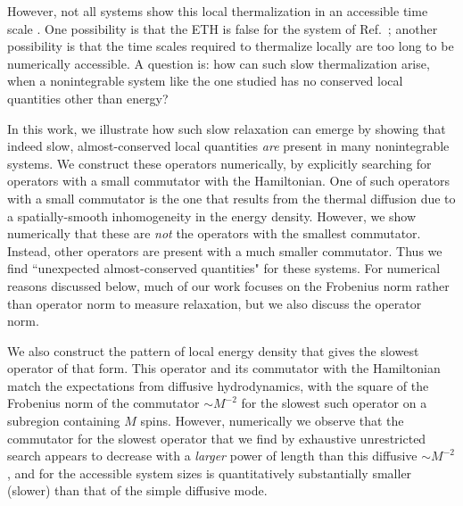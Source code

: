 \documentclass[twocolumn,superscriptaddress, prl,showpacs]{revtex4-1}
\begin{document}
However, not all systems show this local thermalization in an accessible time scale \cite{Banuls:2011}.
One possibility is that the ETH is false for the system of Ref.~; another possibility is that the time scales required to thermalize locally are too long to be numerically accessible.  A question is: how can such slow thermalization arise, when a nonintegrable system like the one studied has no conserved local quantities other than energy?

In this work, we illustrate how such slow relaxation can emerge by showing that indeed slow, almost-conserved local quantities {\it are} present in many nonintegrable systems.  We construct these operators numerically, by explicitly searching for operators with a small commutator with the Hamiltonian.
One of such operators with a small commutator is the one that results from the thermal diffusion due to a spatially-smooth inhomogeneity in the energy density.  However, we show numerically that these are {\it not} the operators with the smallest commutator.  Instead, other operators are present with a much smaller commutator.  Thus we find ``unexpected almost-conserved quantities" for these systems.  For numerical reasons discussed below, much of our work focuses on the Frobenius norm rather than operator norm to measure relaxation, but we also discuss the operator norm.


We also construct the pattern of local energy density that gives the slowest operator of that form.  This operator and its commutator with the Hamiltonian
match the expectations from diffusive hydrodynamics, with the square of the Frobenius norm of the commutator $\sim M^{-2}$ for the slowest such operator on a subregion containing $M$ spins.
However, numerically we observe that the commutator for the slowest operator that we find by exhaustive unrestricted search appears to decrease with a {\it larger} power of length than this diffusive $\sim M^{-2}$, and for the accessible system sizes is quantitatively substantially smaller (slower) than that of the simple diffusive mode.
\end{document}
